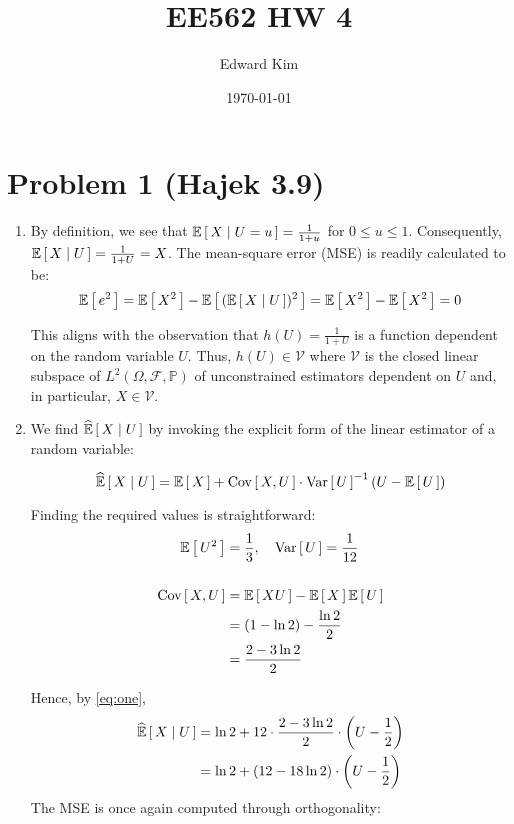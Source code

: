 \documentclass[12pt]{article}%
\title{EE562 HW 4}
\author{Edward Kim}
\date{\today}
\begin{document}
\maketitle
\section{Problem 1 (Hajek 3.9)}
\begin{enumerate}
  \item By definition, we see that $\mathbb{E}\left[\,X\mid U = u\,\right] = \frac{1}{1 + u}$ for $0 \leq u \leq 1$. Consequently, $\mathbb{E}\left[\,X \mid U\,\right] = \frac{1}{1 + U} = X$. The mean-square error (MSE) is readily calculated to be:
  \[ \mathbb{E}\left[\,e^2\,\right] = \mathbb{E}\left[\,X^2\,\right] - \mathbb{E}\left[\,(\mathbb{E}\left[\,X \mid U\,\right])^2\,\right] = \mathbb{E}\left[\,X^2\,\right] - \mathbb{E}\left[\,X^2\,\right]  = 0  \]

  This aligns with the observation that $h(U) = \frac{1}{1 + U}$ is a function dependent on the random variable $U$. Thus, $h(U) \in \mathcal{V}$ where $\mathcal{V}$ is the closed linear subspace of $L^2(\Omega,\mathcal{F},\mathbb{P})$ of unconstrained estimators dependent on $U$ and, in particular, $X \in \mathcal{V}$.

  \item We find $\widehat{ \mathbb{E}}\left[\,{X} \mid {U}\,\right]$ by invoking the explicit form of the linear estimator of a random variable:

  \begin{equation}
 \widehat{ \mathbb{E}}\left[\,{X} \mid {U}\,\right] = \mathbb{E}\left[\,X\,\right] + \text{Cov}\left[\,X,U\,\right]\cdot\text{Var}\left[\,U\,\right]^{-1}\left(U - \mathbb{E}\left[\,U\,\right]\right) \label{eq:one}
  \end{equation}

  Finding the required values is straightforward:
  \begin{align*}
      \mathbb{E}\left[\,U^2\,\right] & = \frac{1}{3}, \quad \text{Var}\left[\,U\,\right] = \frac{1}{12} \\
      \\
      \text{Cov}\left[\,X,U\,\right] & = \mathbb{E}\left[\,XU\,\right] - \mathbb{E}\left[\,X\,\right]\mathbb{E}\left[\,U\,\right] \\
                 & = (1 - \ln{2}) - \frac{\ln{2}}{2} \\
                 &= \frac{2 - 3\ln{2}}{2}
  \end{align*}

  Hence, by \ref{eq:one},
  \begin{align*}
      \widehat{ \mathbb{E}}\left[\,{X} \mid {U}\,\right] & =  \ln{2} + 12 \cdot \frac{2 - 3\ln{2}}{2}\cdot\left(U - \frac{1}{2}\right)\\
      & =  \ln{2} + (12 - 18\ln{2})\cdot\left(U - \frac{1}{2}\right)
  \end{align*}
  The MSE is once again computed through orthogonality:


\end{enumerate}
\end{document}
